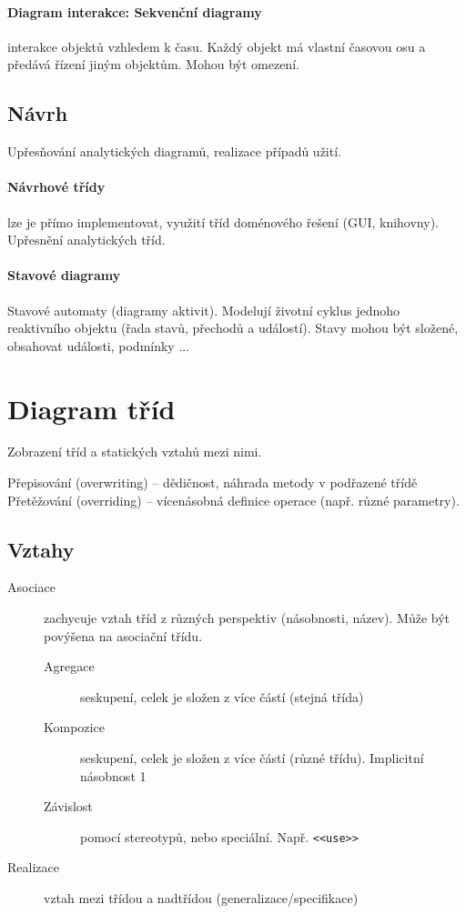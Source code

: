 \documentclass[a4paper, 11pt]{report}
\begin{document}
\paragraph{Diagram interakce: Sekvenční diagramy}
interakce objektů vzhledem k času. Každý objekt má vlastní časovou osu a předává řízení jiným objektům. Mohou být omezení.

\subsection{Návrh}
Upřesňování analytických diagramů, realizace případů užití.

\paragraph{Návrhové třídy}
lze je přímo implementovat, využití tříd doménového řešení (GUI, knihovny). Upřesnění analytických tříd.

\paragraph{Stavové diagramy}
Stavové automaty (diagramy aktivit). Modelují životní cyklus jednoho reaktivního objektu (řada stavů, přechodů a událostí). Stavy mohou být složené, obsahovat události, podmínky ...


\section{Diagram tříd}
Zobrazení tříd a statických vztahů mezi nimi.

Přepisování (overwriting) -- dědičnost, náhrada metody v podřazené třídě\\
Přetěžování (overriding) -- vícenásobná definice operace (např. různé parametry).

\subsection{Vztahy}
\begin{description}
	\item[Asociace] zachycuje vztah tříd z různých perspektiv (násobnosti, název). Může být povýšena na asociační třídu.
	\begin{description}
		\item[Agregace] seskupení, celek je složen z více částí (stejná třída)
		\item[Kompozice] seskupení, celek je složen z více částí (různé třídu). Implicitní násobnost 1
		\item[Závislost] pomocí stereotypů, nebo speciální. Např. \verb|<<use>>|
	\end{description}
	\item[Realizace] vztah mezi třídou a nadtřídou (generalizace/specifikace)
\end{description}
\end{document}
